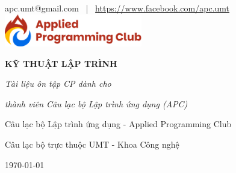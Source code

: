 \begin{titlepage}
\thispagestyle{empty}
\centering

\vspace*{1cm}

{\large apc.umt@gmail.com \, | \, \url{https://www.facebook.com/apc.umt}}\\[1cm]

\includegraphics[width=6cm]{../resource/img/logo.png}\\[3.5cm]
{\fontsize{36}{40}\selectfont\bfseries KỸ THUẬT LẬP TRÌNH\par} 
\vspace{0.6cm}
{\fontsize{18}{22}\selectfont\itshape Tài liệu ôn tập CP dành cho \par}
{\fontsize{18}{22}\selectfont\itshape thành viên Câu lạc bộ Lập trình ứng dụng (APC)\par}
\vspace{5cm}

{\Large Câu lạc bộ Lập trình ứng dụng - Applied Programming Club\par}
\vspace{0.4cm}
{\large Câu lạc bộ trực thuộc UMT - Khoa Công nghệ\par}

\vspace{8cm}

{\Large \today\par}

\vfill
\end{titlepage}
